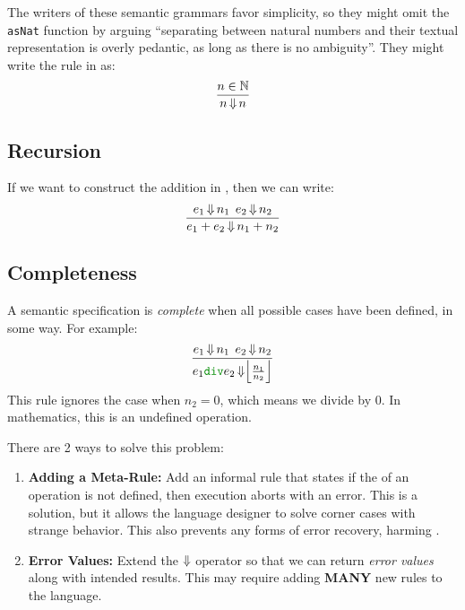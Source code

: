 The writers of these semantic grammars favor simplicity, so they might omit the \texttt{asNat} function by arguing ``separating between natural numbers and their textual representation is overly pedantic, as long as there is no ambiguity''.
They might write the rule in  as:
\begin{equation}\label{eq:Conditional_Rules_Simplified}
  \frac{n \in \operatorname{\mathbb{N}}}{n \operatorname{\Downarrow} n}
\end{equation}

\subsection{Recursion}\label{subsec:Semantics_Recursion}
If we want to construct the addition in , then we can write:
\begin{equation}\label{eq:Semantics_Recursion}
  \frac{e_{1} \operatorname{\Downarrow} n_{1} \:\: e_{2} \operatorname{\Downarrow} n_{2}}{e_{1}+e_{2} \operatorname{\Downarrow} n_{1}+n_{2}}
\end{equation}

\subsection{Completeness}\label{subsec:Semantic_Completeness}
A semantic specification is \emph{complete} when all possible cases have been defined, in some way.
For example:
\begin{equation}\label{eq:Incomplete_Semantic_Rule}
  \frac{e_{1} \EvaluatesTo n_{1} \:\: e_{2} \EvaluatesTo n_{2}}{e_{1} \textcolor{Green4}{\mathtt{div}} e_{2} \EvaluatesTo \Bigl\lfloor \frac{n_{1}}{n_{2}} \Bigr\rfloor}
\end{equation}
This rule ignores the case when $n_{2} = 0$, which means we divide by 0.
In mathematics, this is an undefined operation.

There are 2 ways to solve this problem:
\begin{enumerate}[noitemsep]
\item \textbf{Adding a Meta-Rule:} Add an informal rule that states if the  of an operation is not defined, then execution aborts with an error.
  This is a solution, but it allows the language designer to solve corner cases with strange behavior.
  This also prevents any forms of error recovery, harming .
\item \textbf{Error Values:} Extend the $\operatorname{\Downarrow}$  operator so that we can return \emph{error values} along with intended results.
  This may require adding \textbf{MANY} new rules to the language.
\end{enumerate}

